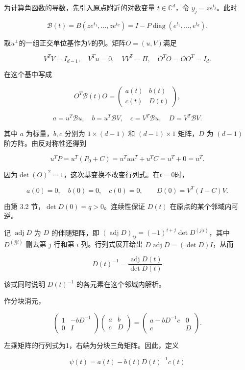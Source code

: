\documentclass[11pt,a4paper]{article}
\providecommand{\mathscr}[1]{\mathcal{#1}}
\begin{document}
为计算角函数的导数，先引入原点附近的对数变量 \(t\in\mathbb C^d\)，令 \(y_j=ze^{t_j}\)。此时

\[\mathscr B(t)=B(ze^{t_1},\ldots,ze^{t_d})
=I-P\operatorname{diag}(e^{t_1},\ldots,e^{t_d}).\]

取\(u^\perp\)的一组正交单位基作为\(V\)的列。矩阵\(O=(u,V)\)满足

\[V^TV=I_{d-1},\quad V^Tu=0,\quad VV^T=\Pi,
\quad O^TO=OO^T=I_d.\]

在这个基中写成

\[O^T\mathscr B(t)O=
\begin{pmatrix}a(t)&b(t)\\c(t)&D(t)\end{pmatrix},\]

\[a=u^T\mathscr Bu,\quad b=u^T\mathscr BV,\quad
c=V^T\mathscr Bu,\quad D=V^T\mathscr BV.\]

其中 \(a\) 为标量，\(b,c\) 分别为 \(1\times(d-1)\) 和 \((d-1)\times1\) 矩阵，\(D\) 为 \((d-1)\) 阶方阵。由反对称性还得到

\[u^TP=u^T(P_0+C)=u^Tuu^T+u^TC=u^T+0=u^T.\]

因为\(\det(O)^2=1\)，这次基变换不改变行列式。在\(t=0\)时，

\[a(0)=0,\quad b(0)=0,\quad c(0)=0,
\qquad D(0)=V^T(I-C)V.\]

由第 3.2 节，\(\det D(0)=q>0\)。连续性保证 \(D(t)\) 在原点的某个邻域内可逆。

记 \(\operatorname{adj}D\) 为 \(D\) 的伴随矩阵，即 \((\operatorname{adj}D)_{ij}=(-1)^{i+j}\det D^{(j|i)}\)，其中 \(D^{(j|i)}\) 删去第 \(j\) 行和第 \(i\) 列。行列式展开给出 \(D\operatorname{adj}D=(\det D)I\)，从而

\[D(t)^{-1}=\frac{\operatorname{adj}D(t)}{\det D(t)}\]

该式同时说明 \(D(t)^{-1}\) 的各元素在这个邻域内解析。

作分块消元，

\[\begin{pmatrix}1&-bD^{-1}\\0&I\end{pmatrix}
\begin{pmatrix}a&b\\c&D\end{pmatrix}
=
\begin{pmatrix}a-bD^{-1}c&0\\c&D\end{pmatrix}.\]

左乘矩阵的行列式为1，右端为分块三角矩阵。因此，定义

\[\psi(t)=a(t)-b(t)D(t)^{-1}c(t)\]
\end{document}
